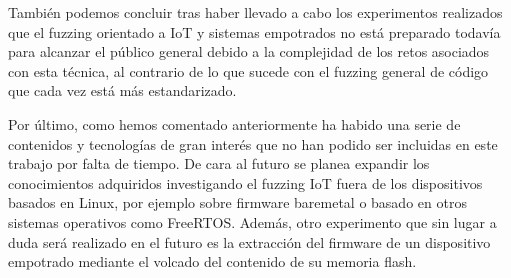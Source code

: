 También podemos concluir tras haber llevado a cabo los experimentos realizados que el fuzzing orientado a IoT y sistemas empotrados no 
está preparado todavía para alcanzar el público general debido a la complejidad de los retos asociados con esta técnica, al contrario de 
lo que sucede con el fuzzing general de código que cada vez está más estandarizado.\bigskip

Por último, como hemos comentado anteriormente ha habido una serie de contenidos y tecnologías de gran interés que no han podido ser 
incluidas en este trabajo por falta de tiempo. De cara al futuro se planea expandir los conocimientos adquiridos investigando el 
fuzzing IoT fuera de los dispositivos basados en Linux, por ejemplo sobre firmware baremetal o basado en otros sistemas operativos 
como FreeRTOS. Además, otro experimento que sin lugar a duda será realizado en el futuro es la extracción del firmware de un dispositivo
empotrado mediante el volcado del contenido de su memoria flash.